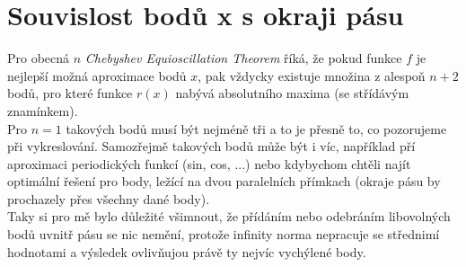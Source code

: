 \documentclass[11pt]{article}
\begin{document}
\section{Souvislost bodů x s okraji pásu}
Pro obecná $n$ \emph{Chebyshev Equioscillation Theorem} říká, že pokud funkce $f$ je nejlepší možná aproximace bodů $x$, pak vždycky existuje množina z alespoň $n+2$ bodů, pro které funkce $r(x)$ nabývá absolutního maxima (se střídávým znamínkem).\\
Pro $n=1$ takových bodů musí být nejméně tři a to je přesně to, co pozorujeme při vykreslování. Samozřejmě takových bodů může být i víc, například pří aproximaci periodických funkcí (sin, cos, ...) nebo kdybychom chtěli najít optimální řešení pro body, ležící na dvou paralelních přímkach (okraje pásu by prochazely přes všechny dané body).\\
Taky si pro mě bylo důležité všimnout, že přídáním nebo odebráním libovolných bodů uvnitř pásu se nic nemění, protože infinity norma nepracuje se střednimí hodnotami a výsledek ovlivňujou právě ty nejvíc vychýlené body.
\end{document}
